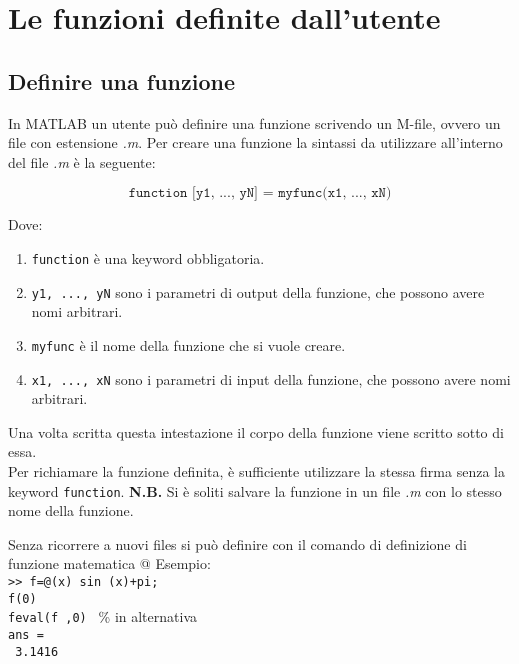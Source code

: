 \chapter{Le funzioni definite dall'utente}
\section{Definire una funzione}
In MATLAB un utente può definire una funzione scrivendo un M-file, ovvero un file con estensione \textit{.m}.
Per creare una funzione la sintassi da utilizzare all'interno del file \textit{.m} è la seguente:

$$  \texttt{function [y1, ..., yN] = myfunc(x1, ..., xN)}$$

Dove:
\begin{enumerate}
	\item	\texttt{function} è una keyword obbligatoria.
	\item	\texttt{y1, ..., yN} sono i parametri di output della funzione, che possono avere nomi arbitrari.
	\item 	\texttt{myfunc} è il nome della funzione che si vuole creare.
	\item	\texttt{x1, ..., xN} sono i parametri di input della funzione, che possono avere nomi arbitrari. 
\end{enumerate}

Una volta scritta questa intestazione il corpo della funzione viene scritto sotto di essa. \\
Per richiamare la funzione definita, è sufficiente utilizzare la stessa firma senza la keyword \texttt{function}. 
\break \break
\textbf{N.B.} Si è soliti salvare la funzione in un file \textit{.m} con lo stesso nome della funzione. 

Senza ricorrere a nuovi files si può definire con il comando di definizione di funzione matematica @
Esempio: \\
\texttt{>> f=@(x) sin (x)+pi;} \\
\texttt{f(0) } \\
\texttt{feval(f ,0) } \% in alternativa \\
\texttt{ans = } \\
\texttt{\hspace{0.5cm} 3.1416} \break